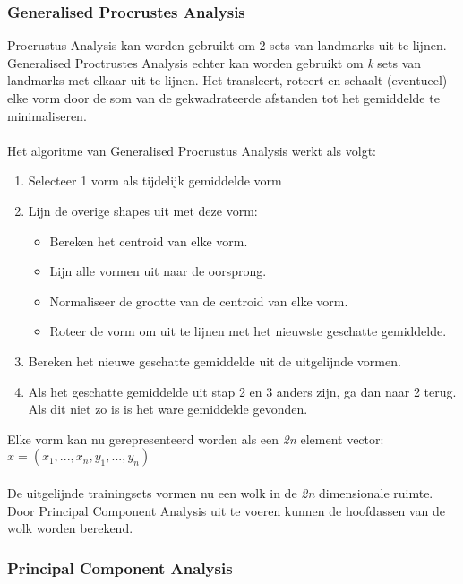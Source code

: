 \subsubsection{Generalised Procrustes Analysis}
Procrustus Analysis kan worden gebruikt om 2 sets van landmarks uit te lijnen. 
Generalised Proctrustes Analysis echter kan worden gebruikt om \textit{k} sets van landmarks met elkaar uit te lijnen. 
Het transleert, roteert en schaalt (eventueel) elke vorm door de som van de gekwadrateerde afstanden tot het gemiddelde te minimaliseren. 
\\
\\
Het algoritme van Generalised Procrustus Analysis werkt als volgt\cite{gpa}:
\begin{enumerate}
	\item Selecteer 1 vorm als tijdelijk gemiddelde vorm
	\item Lijn de overige shapes uit met deze vorm:
	\begin{itemize}
		\item Bereken het centroid van elke vorm.
		\item Lijn alle vormen uit naar de oorsprong.
		\item Normaliseer de grootte van de centroid van elke vorm.
		\item Roteer de vorm om uit te lijnen met het nieuwste geschatte gemiddelde.
	\end{itemize}
	\item Bereken het nieuwe geschatte gemiddelde uit de uitgelijnde vormen.
	\item Als het geschatte gemiddelde uit stap 2 en 3 anders zijn, ga dan naar 2 terug. Als dit niet zo is is het ware gemiddelde gevonden.
\end{enumerate}
\noindent
Elke vorm kan nu gerepresenteerd worden als een \textit{2n} element vector:
$x = (x_{1},...,x_{n},y_{1},...,y_{n})$
\\
\\
De uitgelijnde trainingsets vormen nu een wolk in de \textit{2n} dimensionale ruimte. 
Door Principal Component Analysis uit te voeren kunnen de hoofdassen van de wolk worden berekend.

\subsubsection{Principal Component Analysis}


